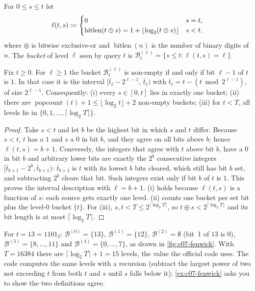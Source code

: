 \begin{definition}\label{def:c07-level}
For $0 \le s \le t$ let
\[
  \ell(t,s) \coloneqq \begin{cases} 0 & s = t, \\ \operatorname{bitlen}(t \oplus s) = 1 + \lfloor \log_2 (t\oplus s)\rfloor & s < t, \end{cases}
\]
where $\oplus$ is bitwise exclusive-or and $\operatorname{bitlen}(n)$ is the number of binary
digits of $n$. The \emph{bucket} of level $\ell$ seen by query $t$ is
$\mathcal{B}_t^{(\ell)} = \{ s \le t : \ell(t,s) = \ell \}$.
\end{definition}

\begin{proposition}\label{prop:c07-fenwick}
Fix $t \ge 0$. For $\ell \ge 1$ the bucket $\mathcal{B}_t^{(\ell)}$ is non-empty if and only if
bit $\ell-1$ of $t$ is $1$. In that case it is the interval
$[\bar t_\ell - 2^{\ell-1},\, \bar t_\ell)$ with $\bar t_\ell = t - (t \bmod 2^{\ell-1})$, of size
$2^{\ell-1}$. Consequently: (i) every $s \in [0,t]$ lies in exactly one bucket; (ii) there are
$\operatorname{popcount}(t) + 1 \le \lfloor\log_2 t\rfloor + 2$ non-empty buckets; (iii) for
$t < T$, all levels lie in $\{0, 1, \dots, \lceil \log_2 T\rceil\}$.
\end{proposition}
\begin{proof}
Take $s < t$ and let $b$ be the highest bit in which $s$ and $t$ differ. Because $s < t$, $t$
has a $1$ and $s$ a $0$ in bit $b$, and they agree on all bits above $b$; hence
$\ell(t,s) = b+1$. Conversely, the integers that agree with $t$ above bit $b$, have a $0$ in
bit $b$ and arbitrary lower bits are exactly the $2^b$ consecutive integers
$[\bar t_{b+1} - 2^b, \bar t_{b+1})$: $\bar t_{b+1}$ is $t$ with its lowest $b$ bits cleared,
which still has bit $b$ set, and subtracting $2^b$ clears that bit. Such integers exist only
if bit $b$ of $t$ is $1$. This proves the interval description with $\ell = b+1$.
(i) holds because $\ell(t,s)$ is a function of $s$: each source gets exactly one level.
(ii) counts one bucket per set bit plus the level-$0$ bucket $\{t\}$. For (iii), $s, t < T
\le 2^{\lceil\log_2 T\rceil}$, so $t\oplus s < 2^{\lceil\log_2 T\rceil}$ and its bit length is at
most $\lceil \log_2 T\rceil$.
\end{proof}

For $t = 13 = 1101_2$: $\mathcal{B}^{(0)} = \{13\}$, $\mathcal{B}^{(1)} = \{12\}$,
$\mathcal{B}^{(2)} = \emptyset$ (bit~1 of $13$ is $0$), $\mathcal{B}^{(3)} = \{8,\dots,11\}$ and
$\mathcal{B}^{(4)} = \{0,\dots,7\}$, as drawn in \cref{fig:c07-fenwick}. With $T = 16384$
there are $\lceil\log_2 T\rceil+1 = 15$ levels, the value the official code uses. The code
computes the same levels with a recursion (subtract the largest power of two not exceeding
$t$ from both $t$ and $s$ until $s$ falls below it); \cref{ex:c07-fenwick} asks you to show
the two definitions agree.

